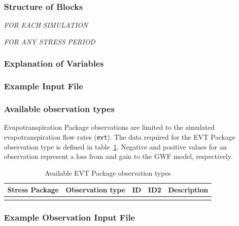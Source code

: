 \vspace{5mm}
\subsubsection{Structure of Blocks}
\vspace{5mm}

\noindent \textit{FOR EACH SIMULATION}


\vspace{5mm}
\noindent \textit{FOR ANY STRESS PERIOD}

\packageperioddescription

\vspace{5mm}
\subsubsection{Explanation of Variables}
\begin{description}

\end{description}

\vspace{5mm}
\subsubsection{Example Input File}


\vspace{5mm}
\subsubsection{Available observation types}
Evapotranspiration Package observations are limited to the simulated evapotranspiration flow rates (\texttt{evt}). The data required for the EVT Package observation type is defined in table~\ref{table:gwf-evtobstype}. Negative and positive values for an observation represent a loss from and gain to the GWF model, respectively.

\begin{longtable}{p{2cm} p{2.75cm} p{2cm} p{1.25cm} p{7cm}}
\caption{Available EVT Package observation types} \tabularnewline

\hline
\hline
\textbf{Stress Package} & \textbf{Observation type} & \textbf{ID} & \textbf{ID2} & \textbf{Description} \\
\hline
\endhead

\hline
\endfoot


\label{table:gwf-evtobstype}
\end{longtable}

\vspace{5mm}
\subsubsection{Example Observation Input File}

